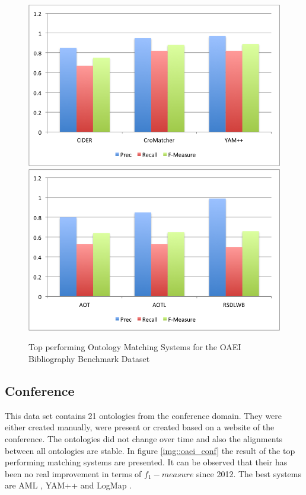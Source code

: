 \documentclass[11pt,titlepage,oneside,openany,a4paper]{report}
\begin{document}
\begin{figure}
 \includegraphics[scale=.5]{figures/oaei/benchmark/top2013.png}  
 \includegraphics[scale=.5]{figures/oaei/benchmark/top2014.png} 
 \caption{Top performing Ontology Matching Systems for  the OAEI Bibliography Benchmark Dataset}
 \label{img::oaei_anatomy}
\end{figure}

\subsection{Conference}
This data set contains 21 ontologies from the conference domain. They were either created manually, were present or created based on a website of the conference. The ontologies did not change over time and also the alignments between all ontologies are stable. In figure \ref{img::oaei_conf} the result of the top performing matching systems are presented. It can be observed that their has been no real improvement in terms of $f_1-measure$ since 2012. The best systems are AML \cite{Faria:2013aa}, YAM++ \cite{Ngo:2012ab} and LogMap \cite{JimACnez-Ruiz:2011aa}. 
\end{document}
